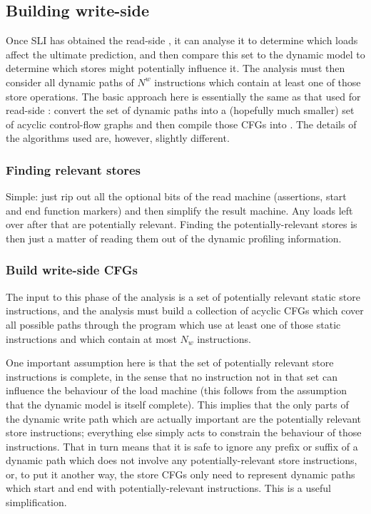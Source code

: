 \documentclass[12pt,a4paper]{book}
\begin{document}
\subsection{Building write-side \StateMachines}

Once SLI has obtained the read-side \StateMachine, it can analyse it to determine which loads affect the ultimate prediction, and then compare this set to the dynamic model to determine which stores might potentially influence it.
The analysis must then consider all dynamic paths of $N^w$ instructions which contain at least one of those store operations.
The basic approach here is essentially the same as that used for read-side \StateMachines: convert the set of dynamic paths into a (hopefully much smaller) set of acyclic control-flow graphs and then compile those CFGs into \StateMachines.
The details of the algorithms used are, however, slightly different.

\subsubsection{Finding relevant stores}

Simple: just rip out all the optional bits of the read machine (assertions, start and end function markers) and then simplify the result machine.
Any loads left over after that are potentially relevant.
Finding the potentially-relevant stores is then just a matter of reading them out of the dynamic profiling information.

\subsubsection{Build write-side CFGs}

The input to this phase of the analysis is a set of potentially relevant static store instructions, and the analysis must build a collection of acyclic CFGs which cover all possible paths through the program which use at least one of those static instructions and which contain at most $N_w$ instructions.

One important assumption here is that the set of potentially relevant store instructions is complete, in the sense that no instruction not in that set can influence the behaviour of the load machine (this follows from the assumption that the dynamic model is itself complete).
This implies that the only parts of the dynamic write path which are actually important are the potentially relevant store instructions; everything else simply acts to constrain the behaviour of those instructions.
That in turn means that it is safe to ignore any prefix or suffix of a dynamic path which does not involve any potentially-relevant store instructions, or, to put it another way, the store CFGs only need to represent dynamic paths which start and end with potentially-relevant instructions.
This is a useful simplification.
\end{document}
